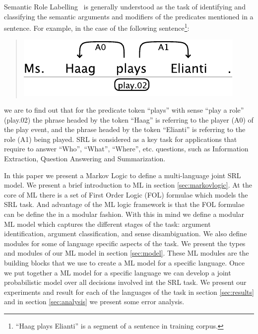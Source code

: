 
Semantic Role Labelling~\citep[SRL, ][]{marquez08srl} is generally understood as 
the task of identifying and classifying the semantic arguments and modifiers of 
the predicates mentioned in a sentence. For example, in the case of the 
following sentence\footnote{``Haag plays Elianti'' is a segment of a sentence in 
training corpus.}:
\begin{quote}
\begin{center}
    \includegraphics[scale=.63]{haag-example}
\end{center}
\end{quote}
we are to find out that for the predicate token {}``plays'' with sense ``play a 
role'' (play.02) the phrase headed by the token {}``Haag'' is referring to the 
player (A0) of the play event, and the phrase headed by the token {}``Elianti''  
is referring to the role (A1) being played. SRL is considered as a key task for 
applications that require to answer {}``Who'', {}``What'', {}``Where'', etc.  
questions, such as Information Extraction, Question Answering and Summarization.  

In this paper we present a Markov Logic \citep[ML,][]{richardson06mln} to define 
a multi-language joint SRL model. We present a brief introduction to ML in 
section \ref{sec:markovlogic}.  At the core of ML there is a set of First Order 
Logic (FOL) formulae which models the SRL task. And advantage of the ML logic 
framework is that the FOL formulae can be define the in a modular fashion.  With 
this in mind we define a modular ML model which captures the different stages of 
the task: argument identification, argument classification, and sense 
disambiguation. We also define modules for some of language specific aspects of 
the task. We present the types and modules of our ML model in section 
\ref{sec:model}. These ML modules are the building blocks that we use to create 
a ML model for a specific language. Once we put together a ML model for a 
specific language we can develop a joint probabilistic model over all decisions 
involved int the SRL task. We present our experiments and result for each of the 
languages of the task in section \ref{sec:results} and in section 
\ref{sec:analysis} we present some error analysis.

